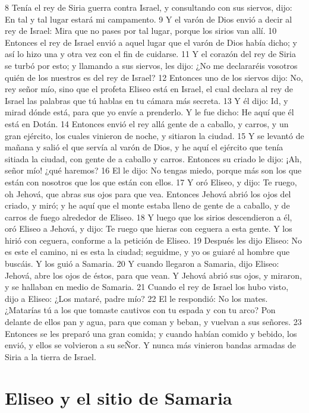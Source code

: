 8 Tenía el rey de Siria guerra contra Israel, y consultando con sus siervos, dijo: En tal y tal lugar estará mi campamento.
9 Y el varón de Dios envió a decir al rey de Israel: Mira que no pases por tal lugar, porque los sirios van allí.
10 Entonces el rey de Israel envió a aquel lugar que el varón de Dios había dicho; y así lo hizo una y otra vez con el fin de cuidarse.
11 Y el corazón del rey de Siria se turbó por esto; y llamando a sus siervos, les dijo: ¿No me declararéis vosotros quién de los nuestros es del rey de Israel?
12 Entonces uno de los siervos dijo: No, rey señor mío, sino que el profeta Eliseo está en Israel, el cual declara al rey de Israel las palabras que tú hablas en tu cámara más secreta.
13 Y él dijo: Id, y mirad dónde está, para que yo envíe a prenderlo. Y le fue dicho: He aquí que él está en Dotán.
14 Entonces envió el rey allá gente de a caballo, y carros, y un gran ejército, los cuales vinieron de noche, y sitiaron la ciudad.
15 Y se levantó de mañana y salió el que servía al varón de Dios, y he aquí el ejército que tenía sitiada la ciudad, con gente de a caballo y carros. Entonces su criado le dijo: ¡Ah, señor mío! ¿qué haremos?
16 El le dijo: No tengas miedo, porque más son los que están con nosotros que los que están con ellos.
17 Y oró Eliseo, y dijo: Te ruego, oh Jehová, que abras sus ojos para que vea. Entonces Jehová abrió los ojos del criado, y miró; y he aquí que el monte estaba lleno de gente de a caballo, y de carros de fuego alrededor de Eliseo.
18 Y luego que los sirios descendieron a él, oró Eliseo a Jehová, y dijo: Te ruego que hieras con ceguera a esta gente. Y los hirió con ceguera, conforme a la petición de Eliseo.
19 Después les dijo Eliseo: No es este el camino, ni es esta la ciudad; seguidme, y yo os guiaré al hombre que buscáis. Y los guió a Samaria.
20 Y cuando llegaron a Samaria, dijo Eliseo: Jehová, abre los ojos de éstos, para que vean. Y Jehová abrió sus ojos, y miraron, y se hallaban en medio de Samaria.
21 Cuando el rey de Israel los hubo visto, dijo a Eliseo: ¿Los mataré, padre mío?
22 El le respondió: No los mates. ¿Matarías tú a los que tomaste cautivos con tu espada y con tu arco? Pon delante de ellos pan y agua, para que coman y beban, y vuelvan a sus señores.
23 Entonces se les preparó una gran comida; y cuando habían comido y bebido, los envió, y ellos se volvieron a su seÑor. Y nunca más vinieron bandas armadas de Siria a la tierra de Israel.

\section*{Eliseo y el sitio de Samaria}


